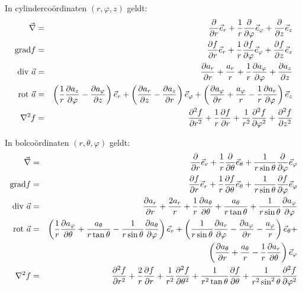 \documentclass[twoside]{report}
\begin{document}
In cylinderco\"ordinaten $(r,\varphi,z)$ geldt:
\begin{eqnarray*}
\vec{\nabla}     &=&\Q{}{r}\ee{r}+\frac{1}{r}\Q{}{\varphi}\ee{\varphi}+\Q{}{z}\ee{z}\\
{\rm grad}f      &=&\Q{f}{r}\ee{r}+\frac{1}{r}\Q{f}{\varphi}\ee{\varphi}+\Q{f}{z}\ee{z}\\
{\rm div}~\vec{a}&=&\Q{a_r}{r}+\frac{a_r}{r}+\frac{1}{r}\Q{a_\varphi}{\varphi}+\Q{a_z}{z}\\
{\rm rot}~\vec{a}&=&\left(\frac{1}{r}\Q{a_z}{\varphi}-\Q{a_\varphi}{z}\right)\ee{r}+
                    \left(\Q{a_r}{z}-\Q{a_z}{r}\right)\ee{\varphi}+
                    \left(\Q{a_\varphi}{r}+\frac{a_\varphi}{r}-\frac{1}{r}\Q{a_r}{\varphi}\right)\ee{z}\\
\nabla^2 f       &=&\QQ{f}{r}+\frac{1}{r}\Q{f}{r}+\frac{1}{r^2}\QQ{f}{\varphi}+\QQ{f}{z}
\end{eqnarray*}

In bolco\"ordinaten $(r,\theta,\varphi)$ geldt:
\begin{eqnarray*}
\vec{\nabla}     &=&\Q{}{r}\ee{r}+\frac{1}{r}\Q{}{\theta}\ee{\theta}+\frac{1}{r\sin\theta}\Q{}{\varphi}\ee{\varphi}\\
{\rm grad}f      &=&\Q{f}{r}\ee{r}+\frac{1}{r}\Q{f}{\theta}\ee{\theta}+\frac{1}{r\sin\theta}\Q{f}{\varphi}\ee{\varphi}\\
{\rm div}~\vec{a}&=&\Q{a_r}{r}+\frac{2a_r}{r}+\frac{1}{r}\Q{a_\theta}{\theta}+\frac{a_\theta}{r\tan\theta}+\frac{1}{r\sin\theta}\Q{a_\varphi}{\varphi}\\
{\rm rot}~\vec{a}&=&\left(\frac{1}{r}\Q{a_\varphi}{\theta}+\frac{a_\theta}{r\tan\theta}-\frac{1}{r\sin\theta}\Q{a_\theta}{\varphi}\right)\ee{r}+
                    \left(\frac{1}{r\sin\theta}\Q{a_r}{\varphi}-\Q{a_\varphi}{r}-\frac{a_\varphi}{r}\right)\ee{\theta}+\\
                 &&\left(\Q{a_\theta}{r}+\frac{a_\theta}{r}-\frac{1}{r}\Q{a_r}{\theta}\right)\ee{\varphi}\\
\nabla^2 f       &=&\QQ{f}{r}+\frac{2}{r}\Q{f}{r}+\frac{1}{r^2}\QQ{f}{\theta}+\frac{1}{r^2\tan\theta}\Q{f}{\theta}+\frac{1}{r^2\sin^2\theta}\QQ{f}{\varphi}
\end{eqnarray*}
\end{document}
